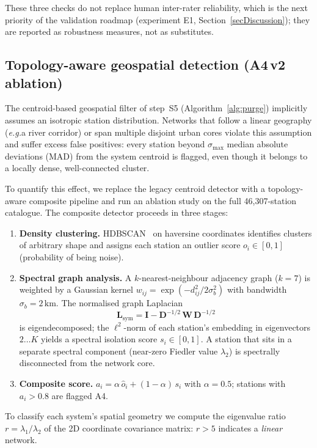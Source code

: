 \documentclass[11pt,a4paper]{article}
\newcommand{\eg}{\emph{e.g.}}
\begin{document}
These three checks do not replace human inter-rater reliability, which
is the next priority of the validation roadmap (experiment E1,
Section~\ref{secDiscussion}); they are reported as robustness
measures, not as substitutes.

\subsection{Topology-aware geospatial detection (A4\,v2 ablation)}\label{secAblation}
The centroid-based geospatial filter of step~S5 (Algorithm~\ref{alg:purge})
implicitly assumes an isotropic station distribution. Networks that
follow a linear geography (\eg a river corridor) or span multiple
disjoint urban cores violate this assumption and suffer excess false
positives: every station beyond $\sigma_{\max}$ median absolute
deviations (MAD) from the system centroid is flagged, even though it
belongs to a locally dense, well-connected cluster.

To quantify this effect, we replace the legacy centroid detector with a
topology-aware composite pipeline and run an ablation study on the full
46{,}307-station catalogue. The composite detector proceeds in three
stages:
%
\begin{enumerate}[nosep]
\item \textbf{Density clustering.} HDBSCAN~\cite{Campello2013HDBSCAN}
      on haversine coordinates identifies clusters of arbitrary shape
      and assigns each station an outlier score
      $o_i \in [0,1]$ (probability of being noise).
\item \textbf{Spectral graph analysis.} A $k$-nearest-neighbour
      adjacency graph ($k = 7$) is weighted by a Gaussian kernel
      $w_{ij} = \exp(-d_{ij}^2 / 2\sigma_b^2)$ with bandwidth
      $\sigma_b = 2\,\text{km}$. The normalised graph Laplacian
      \begin{equation}\label{eq:laplacian}
        \mathbf{L}_{\text{sym}} = \mathbf{I}
          - \mathbf{D}^{-1/2}\,\mathbf{W}\,\mathbf{D}^{-1/2}
      \end{equation}
      is eigendecomposed; the $\ell^2$-norm of each station's
      embedding in eigenvectors $2 \ldots K$ yields a spectral
      isolation score $s_i \in [0,1]$. A station that sits in a
      separate spectral component (near-zero Fiedler value $\lambda_2$)
      is spectrally disconnected from the network core.
\item \textbf{Composite score.}
      $a_i = \alpha\,\hat o_i + (1-\alpha)\,s_i$
      with $\alpha = 0.5$; stations with $a_i > 0.8$ are flagged A4.
\end{enumerate}
%
To classify each system's spatial geometry we compute the eigenvalue
ratio $r = \lambda_1 / \lambda_2$ of the 2D coordinate covariance
matrix: $r > 5$ indicates a \emph{linear} network.
\end{document}
